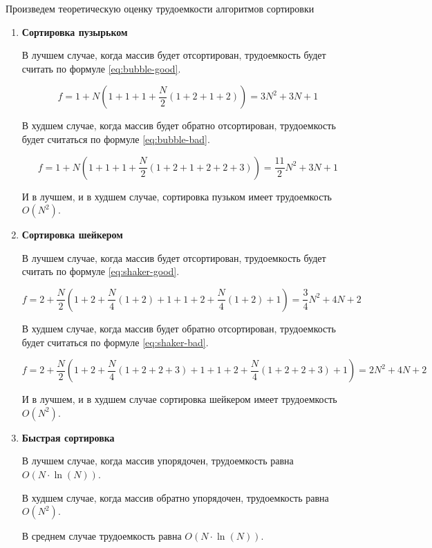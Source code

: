 \documentclass[a4paper,12pt]{article}
\begin{document}
Произведем теоретическую оценку трудоемкости алгоритмов сортировки

\begin{enumerate}
    \item \textbf{Сортировка пузырьком}

        В лучшем случае, когда массив будет отсортирован, трудоемкость будет считать
        по формуле \ref{eq:bubble-good}.

        \begin{equation}\label{eq:bubble-good}
            f = 1 + N(1 + 1 + 1 + \frac{N}{2}(1 + 2 + 1 + 2)) =
            3N^2 + 3N + 1
        \end{equation}

        В худшем случае, когда массив будет обратно отсортирован, трудоемкость будет
        считаться по формуле \ref{eq:bubble-bad}.

        \begin{equation}\label{eq:bubble-bad}
            f = 1 + N(1 + 1 + 1 + \frac{N}{2}(1 + 2 + 1 + 2 + 2 + 3)) =
            \frac{11}{2}N^2 + 3N + 1
        \end{equation}

        И в лучшем, и в худшем случае, сортировка пузьком имеет трудоемкость $O(N^2)$.

    \item \textbf{Сортировка шейкером}

        В лучшем случае, когда массив будет отсортирован, трудоемкость будет считать
        по формуле \ref{eq:shaker-good}.

        \begin{equation}\label{eq:shaker-good}
            f =
            2 + \frac{N}{2}
            (1 + 2 + \frac{N}{4}(1 + 2) + 1 +
             1 + 2 + \frac{N}{4}(1 + 2) + 1) =
            \frac{3}{4}N^2 + 4N + 2
        \end{equation}

        В худшем случае, когда массив будет обратно отсортирован, трудоемкость будет
        считаться по формуле \ref{eq:shaker-bad}.

        \begin{equation}\label{eq:shaker-bad}
            f =
            2 + \frac{N}{2}
            (1 + 2 + \frac{N}{4}(1 + 2 + 2 + 3) + 1 +
             1 + 2 + \frac{N}{4}(1 + 2 + 2 + 3) + 1) =
            2N^2 + 4N + 2
        \end{equation}

        И в лучшем, и в худшем случае сортировка шейкером имеет трудоемкость $O(N^2)$.

    \item \textbf{Быстрая сортировка} \cite{knuth}

        В лучшем случае, когда массив упорядочен, трудоемкость равна $O(N \cdot \ln(N))$.

        В худшем случае, когда массив обратно упорядочен, трудоемкость равна $O(N^2)$.

        В среднем случае трудоемкость равна $O(N \cdot \ln(N))$.
\end{enumerate}
\end{document}
